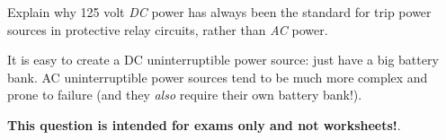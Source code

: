 

Explain why 125 volt {\it DC} power has always been the standard for trip power sources in protective relay circuits, rather than {\it AC} power.







It is easy to create a DC uninterruptible power source: just have a big battery bank.  AC uninterruptible power sources tend to be much more complex and prone to failure (and they {\it also} require their own battery bank!).







{\bf This question is intended for exams only and not worksheets!}.



